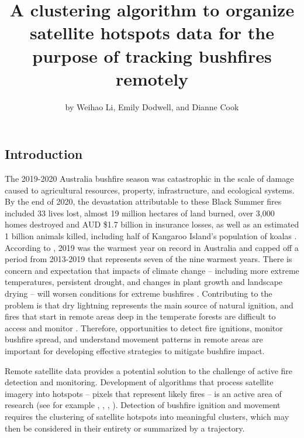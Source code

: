 \title{A clustering algorithm to organize satellite hotspots data for
the purpose of tracking bushfires remotely}
\author{by Weihao Li, Emily Dodwell, and Dianne Cook}

\maketitle


\hypertarget{introduction}{%
\subsection{Introduction}\label{introduction}}

The 2019-2020 Australia bushfire season was catastrophic in the scale of
damage caused to agricultural resources, property, infrastructure, and
ecological systems. By the end of 2020, the devastation attributable to
these Black Summer fires included 33 lives lost, almost 19 million
hectares of land burned, over 3,000 homes destroyed and AUD \$1.7
billion in insurance losses, as well as an estimated 1 billion animals
killed, including half of Kangaroo Island's population of koalas
\citep{Filkov2020}. According to \citet{climate2020}, 2019 was the
warmest year on record in Australia and capped off a period from
2013-2019 that represents seven of the nine warmest years. There is
concern and expectation that impacts of climate change -- including more
extreme temperatures, persistent drought, and changes in plant growth
and landscape drying -- will worsen conditions for extreme bushfires
\citep{climate2020, Deb2020}. Contributing to the problem is that dry
lightning represents the main source of natural ignition, and fires that
start in remote areas deep in the temperate forests are difficult to
access and monitor \citep{Abram2021}. Therefore, opportunities to detect
fire ignitions, monitor bushfire spread, and understand movement
patterns in remote areas are important for developing effective
strategies to mitigate bushfire impact.

Remote satellite data provides a potential solution to the challenge of
active fire detection and monitoring. Development of algorithms that
process satellite imagery into hotspots -- pixels that represent likely
fires -- is an active area of research (see for example
\citet{Giglio2016}, \citet{Xu2017}, \citet{Wickramasinghe2016},
\citet{Jang2019}). Detection of bushfire ignition and movement requires
the clustering of satellite hotspots into meaningful clusters, which may
then be considered in their entirety or summarized by a trajectory.

